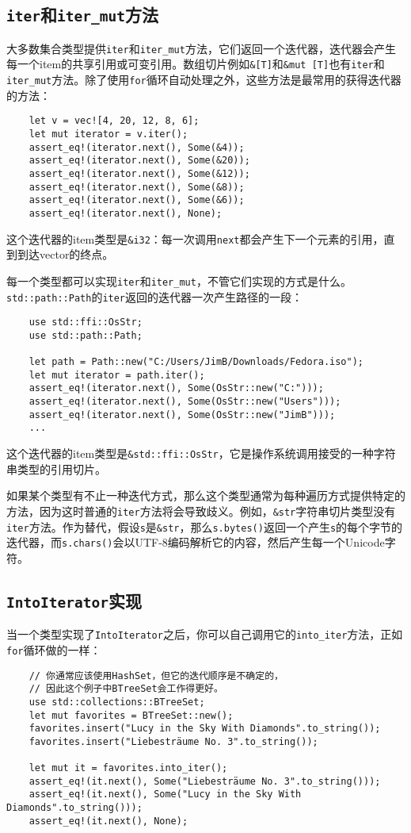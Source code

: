 \subsection{\texttt{iter}和\texttt{iter\_mut}方法}
大多数集合类型提供\texttt{iter}和\texttt{iter\_mut}方法，它们返回一个迭代器，迭代器会产生每一个item的共享引用或可变引用。数组切片例如\texttt{\&[T]}和\texttt{\&mut [T]}也有\texttt{iter}和\texttt{iter\_mut}方法。除了使用\texttt{for}循环自动处理之外，这些方法是最常用的获得迭代器的方法：
\begin{verbatim}
    let v = vec![4, 20, 12, 8, 6];
    let mut iterator = v.iter();
    assert_eq!(iterator.next(), Some(&4));
    assert_eq!(iterator.next(), Some(&20));
    assert_eq!(iterator.next(), Some(&12));
    assert_eq!(iterator.next(), Some(&8));
    assert_eq!(iterator.next(), Some(&6));
    assert_eq!(iterator.next(), None);
\end{verbatim}

这个迭代器的item类型是\texttt{\&i32}：每一次调用\texttt{next}都会产生下一个元素的引用，直到到达vector的终点。

每一个类型都可以实现\texttt{iter}和\texttt{iter\_mut}，不管它们实现的方式是什么。\texttt{std::path::Path}的\texttt{iter}返回的迭代器一次产生路径的一段：
\begin{verbatim}
    use std::ffi::OsStr;
    use std::path::Path;

    let path = Path::new("C:/Users/JimB/Downloads/Fedora.iso");
    let mut iterator = path.iter();
    assert_eq!(iterator.next(), Some(OsStr::new("C:")));
    assert_eq!(iterator.next(), Some(OsStr::new("Users")));
    assert_eq!(iterator.next(), Some(OsStr::new("JimB")));
    ...
\end{verbatim}

这个迭代器的item类型是\texttt{\&std::ffi::OsStr}，它是操作系统调用接受的一种字符串类型的引用切片。

如果某个类型有不止一种迭代方式，那么这个类型通常为每种遍历方式提供特定的方法，因为这时普通的\texttt{iter}方法将会导致歧义。例如，\texttt{\&str}字符串切片类型没有\texttt{iter}方法。作为替代，假设\texttt{s}是\texttt{\&str}，那么\texttt{s.bytes()}返回一个产生\texttt{s}的每个字节的迭代器，而\texttt{s.chars()}会以UTF-8编码解析它的内容，然后产生每一个Unicode字符。

\subsection{\texttt{IntoIterator}实现}
当一个类型实现了\texttt{IntoIterator}之后，你可以自己调用它的\texttt{into\_iter}方法，正如\texttt{for}循环做的一样：
\begin{verbatim}
    // 你通常应该使用HashSet，但它的迭代顺序是不确定的，
    // 因此这个例子中BTreeSet会工作得更好。
    use std::collections::BTreeSet;
    let mut favorites = BTreeSet::new();
    favorites.insert("Lucy in the Sky With Diamonds".to_string());
    favorites.insert("Liebesträume No. 3".to_string());

    let mut it = favorites.into_iter();
    assert_eq!(it.next(), Some("Liebesträume No. 3".to_string()));
    assert_eq!(it.next(), Some("Lucy in the Sky With Diamonds".to_string()));
    assert_eq!(it.next(), None);
\end{verbatim}

